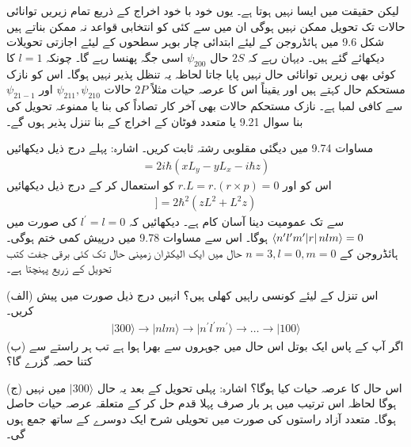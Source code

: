  لیکن حقیقت میں ایسا نہیں ہوتا ہے۔ یوں خود با خود اخراج کے ذریع تمام زیریں توانائی حالات تک تحویل ممکن نہیں ہوگی ان میں سے کئی کو انتخابی قواعد نہ ممکن بناتے ہیں شکل \num{9.6} میں ہائڈروجن کے لیئے ابتدائی چار بوہر سطحوں کے لیئے اجازتی تحویلات دیکھائے گئے ہیں۔ دیہان رہے کہ \(2S\) حال  \(\psi_{200}\) اسی جگہ پھنسا رہے گا۔ چونکہ \(l=1\) کا کوئی بھی زیریں توانائی حال نہیں پایا جاتا لحاظہ یہ تنظل پذیر نہیں ہوگا۔ اس کو نازک مستحکم حال کہتے ہیں اور یقیناً اس کا عرصہ حیات مثلاً \(2P\) حالات \(\psi_{211}, \psi_{210}\) اور \(\psi_{21-1}\) سے کافی لمبا ہے۔ نازک مستحکم حالات بھی آخر کار تصاداً کی بنا یا ممنوعہ تحویل کی بنا سوال \num{9.21} یا متعدد فوٹان  کے اخراج کے بنا تنزل پذیر ہوں گے۔
 
مساوات \num{9.74} میں دیگئی  مقلوبی  رشتہ ثابت کریں۔ اشارہ: پہلے درج ذیل دیکھائیں
\begin{align*}
	[L^2, z] = 2i\hbar(xL_y-yL_x-i\hbar z)
\end{align*}
اس کو اور \(r.L = r.(r\times p) = 0\) کو استعمال کر کے درج ذیل دیکھائیں
\begin{align*}
[L^2, [L^2, z]] = 2\hbar^2(zL^2+L^2z)	
\end{align*}
 سے  تک عمومیت دینا آسان کام ہے۔
دیکھائیں کہ \(l^\prime = l = 0\) کی صورت میں \(\langle n^\prime l^\prime m^\prime \abs{r}nlm \rangle = 0\) ہوگا۔ اس سے مساوات \num{9.78} میں درپیش کمی ختم ہوگی۔
ہائڈروجن کے \(n = 3, l = 0, m = 0\) حال میں ایک الیکٹران زمینی حال تک کئی برقی جفت کتب تحویل کے زریع پہنچتا ہے۔

(الف) اس تنزل کے لیئے کونسی راہیں کھلی ہیں؟ انہیں درج ذیل صورت میں پیش کریں۔
\begin{align*}
	\mid300\rangle\rightarrow \mid nlm\rangle\rightarrow \mid n^\prime l^\prime m^\prime \rangle\rightarrow\dots\rightarrow\mid100\rangle
\end{align*}
(ب) اگر آپ کے پاس ایک بوتل اس حال میں جوہروں سے بھرا ہوا ہے تب ہر راستے سے کتنا حصہ گزرے گا؟

(ج) اس حال کا عرصہ حیات کیا ہوگا؟ اشارہ: پہلی تحویل کے بعد یہ حال \(\mid300\rangle\) میں نہیں ہوگا لحاظہ اس ترتیب میں ہر بار صرف پہلا قدم حل کر کے متعلقہ عرصہ حیات حاصل ہوگا۔ متعدد آزاد راستوں کی صورت میں تحویلی شرح ایک دوسرے کے ساتھ جمع ہوں گی۔

